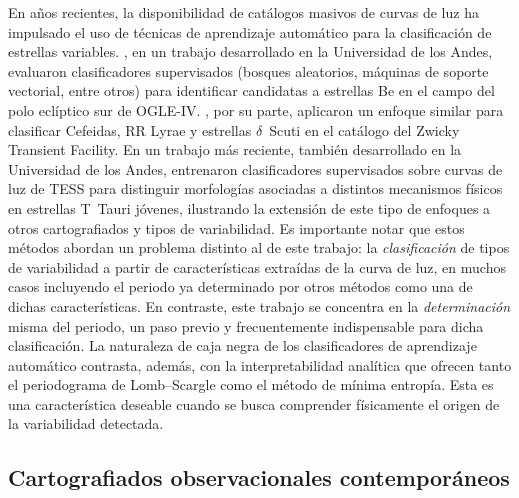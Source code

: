 \documentclass[12pt,letterpaper,oneside]{book}
\begin{document}
En a\~nos recientes, la disponibilidad de cat\'alogos masivos de curvas de luz ha impulsado el uso de t\'ecnicas de aprendizaje autom\'atico para la clasificaci\'on de estrellas variables. \citet{PerezOrtiz2017}, en un trabajo desarrollado en la Universidad de los Andes, evaluaron clasificadores supervisados (bosques aleatorios, m\'aquinas de soporte vectorial, entre otros) para identificar candidatas a estrellas Be en el campo del polo ecl\'iptico sur de OGLE-IV. \citet{naydenkin_2020}, por su parte, aplicaron un enfoque similar para clasificar Cefeidas, RR Lyrae y estrellas $\delta$~Scuti en el cat\'alogo del Zwicky Transient Facility. En un trabajo m\'as reciente, tambi\'en desarrollado en la Universidad de los Andes, \citet{Elizabethson2023} entrenaron clasificadores supervisados sobre curvas de luz de TESS para distinguir morfolog\'ias asociadas a distintos mecanismos f\'isicos en estrellas T~Tauri j\'ovenes, ilustrando la extensi\'on de este tipo de enfoques a otros cartografiados y tipos de variabilidad. Es importante notar que estos m\'etodos abordan un problema distinto al de este trabajo: la \emph{clasificaci\'on} de tipos de variabilidad a partir de caracter\'isticas extra\'idas de la curva de luz, en muchos casos incluyendo el periodo ya determinado por otros m\'etodos como una de dichas caracter\'isticas. En contraste, este trabajo se concentra en la \emph{determinaci\'on} misma del periodo, un paso previo y frecuentemente indispensable para dicha clasificaci\'on. La naturaleza de caja negra de los clasificadores de aprendizaje autom\'atico contrasta, adem\'as, con la interpretabilidad anal\'itica que ofrecen tanto el periodograma de Lomb--Scargle como el m\'etodo de m\'inima entrop\'ia. Esta es una caracter\'istica deseable cuando se busca comprender f\'isicamente el origen de la variabilidad detectada.

\subsection{Cartografiados observacionales contempor\'aneos}
\end{document}
